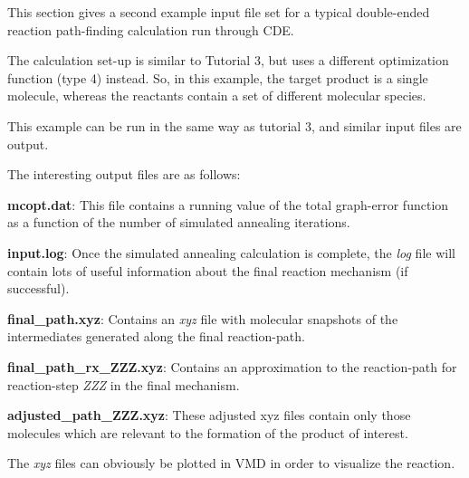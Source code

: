This section gives a second example input file set for a typical double-\/ended reaction path-\/finding calculation run through C\+DE.

The calculation set-\/up is similar to Tutorial 3, but uses a different optimization function (type 4) instead. So, in this example, the target product is a single molecule, whereas the reactants contain a set of different molecular species.

This example can be run in the same way as tutorial 3, and similar input files are output.

The interesting output files are as follows\+:


\begin{DoxyItemize}
\item {\bfseries{mcopt.\+dat}}\+: This file contains a running value of the total graph-\/error function as a function of the number of simulated annealing iterations.
\item {\bfseries{input.\+log}}\+: Once the simulated annealing calculation is complete, the {\itshape log} file will contain lots of useful information about the final reaction mechanism (if successful).
\item {\bfseries{final\+\_\+path.\+xyz}}\+: Contains an {\itshape xyz} file with molecular snapshots of the intermediates generated along the final reaction-\/path.
\item {\bfseries{final\+\_\+path\+\_\+rx\+\_\+\+Z\+Z\+Z.\+xyz}}\+: Contains an approximation to the reaction-\/path for reaction-\/step {\itshape Z\+ZZ} in the final mechanism.
\item {\bfseries{adjusted\+\_\+path\+\_\+\+Z\+Z\+Z.\+xyz}}\+: These adjusted xyz files contain only those molecules which are relevant to the formation of the product of interest.
\end{DoxyItemize}

The {\itshape xyz} files can obviously be plotted in V\+MD in order to visualize the reaction. 